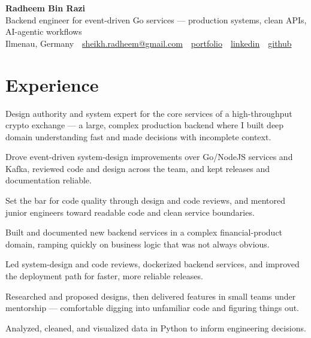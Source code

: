 \documentclass[11pt,a4paper]{resume}
\makeatletter
\newcommand{\Portfolio}{https://radheem.github.io/my-cv}
\newcommand{\PortfolioText}{portfolio}
\newcommand{\GitHub}{https://github.com/radheem}
\newcommand{\LinkedIn}{https://www.linkedin.com/in/radheem-razi}
\newcommand{\Email}{sheikh.radheem@gmail.com}
\makeatother
\begin{document}
\begin{center}
  {\huge\bfseries Radheem Bin Razi}\\[3pt]
  {\large Backend engineer for event-driven Go services — production systems, clean APIs, AI-agentic workflows}\\[6pt]
  \small
  Ilmenau, Germany \,\textbar\,
  \href{mailto:\Email}{\Email} \,\textbar\,
  \href{\Portfolio}{\PortfolioText} \,\textbar\,
  \href{\LinkedIn}{linkedin} \,\textbar\,
  \href{\GitHub}{github}
\end{center}
\vspace{2pt}

\section{Experience}

\bullets
  \item Design authority and system expert for the core services of a high-throughput crypto exchange — a large, complex production backend where I built deep domain understanding fast and made decisions with incomplete context.
  \item Drove event-driven system-design improvements over Go/NodeJS services and Kafka, reviewed code and design across the team, and kept releases and documentation reliable.
  \item Set the bar for code quality through design and code reviews, and mentored junior engineers toward readable code and clean service boundaries.
\bulletsend
\vspace{3pt}
\bullets
  \item Built and documented new backend services in a complex financial-product domain, ramping quickly on business logic that was not always obvious.
  \item Led system-design and code reviews, dockerized backend services, and improved the deployment path for faster, more reliable releases.
\bulletsend
\vspace{3pt}
\bullets
  \item Researched and proposed designs, then delivered features in small teams under mentorship — comfortable digging into unfamiliar code and figuring things out.
  \item Analyzed, cleaned, and visualized data in Python to inform engineering decisions.
\bulletsend
\vspace{3pt}
\end{document}
